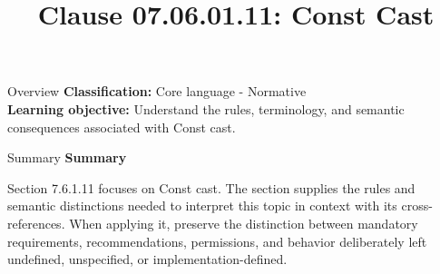 \documentclass[10pt,letterpaper]{article}
\title{Clause 07.06.01.11: Const Cast}
\author{}
\date{}
\begin{document}
\maketitle
\begin{CornellOverviewBox}{Overview}
\textbf{Classification:} Core language - Normative\\[2pt]
\textbf{Learning objective:} Understand the rules, terminology, and semantic consequences associated with Const cast.
\end{CornellOverviewBox}\begin{CornellSummaryBox}{Summary}
{\sffamily\bfseries\color{Accent} Summary}\par\vspace{3pt}Section 7.6.1.11 focuses on Const cast. The section supplies the rules and semantic distinctions needed to interpret this topic in context with its cross-references. When applying it, preserve the distinction between mandatory requirements, recommendations, permissions, and behavior deliberately left undefined, unspecified, or implementation-defined.
\end{CornellSummaryBox}
\end{document}
